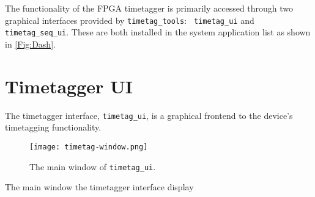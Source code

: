 The functionality of the FPGA timetagger is primarily accessed through
two graphical interfaces provided by {\tt timetag\_tools}: {\tt
 timetag\_ui} and {\tt timetag\_seq\_ui}. These are both installed in
the system application list as shown in \ref{Fig:Dash}.

\section{Timetagger UI}

The timetagger interface, {\tt timetag\_ui}, is a graphical frontend to
the device's timetagging functionality.

\begin{figure}
  \center
  \texttt{[image: timetag-window.png]}
  \caption{The main window of {\tt timetag\_ui}.}
  \label{Fig:MainWindow}
\end{figure}

The main window the timetagger interface display 

